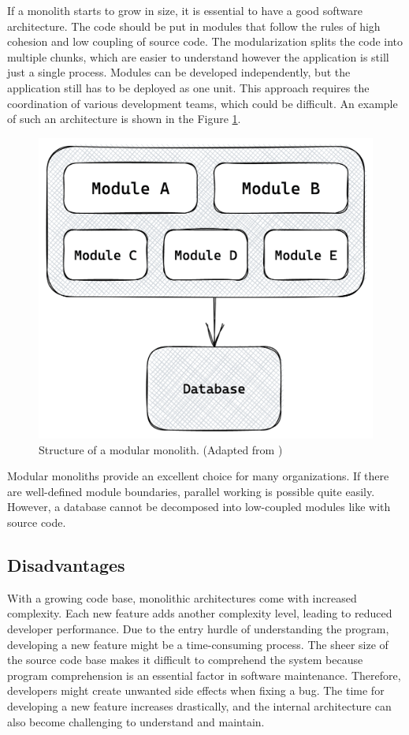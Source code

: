 \noindent If a monolith starts to grow in size, it is essential to have a good software architecture. The code should be put in modules that follow the rules of high cohesion and low coupling of source code. The modularization splits the code into multiple chunks, which are easier to understand however the application is still just a single process. Modules can be developed independently, but the application still has to be deployed as one unit. This approach requires the coordination of various development teams, which could be difficult. \cite[12-13]{book:2018:richardson:background:bff:microservices-patterns} \cite[12-13]{book:2019:newman:background:monolith:monolith-to-microservices} An example of such an architecture is shown in the Figure \ref{fig:background:monolith:module-monolith-sketch}.

\ifshowImages
\begin{figure}[H]
  \centering
  \includegraphics[width=0.4\linewidth]{images/background/monolith/modular-monolith-sketch.png}
  \caption{Structure of a modular monolith. (Adapted from \cite[13]{book:2019:newman:background:monolith:monolith-to-microservices})}\label{fig:background:monolith:module-monolith-sketch}
\end{figure}
\fi

\noindent Modular monoliths provide an excellent choice for many organizations. If there are well-defined module boundaries, parallel working is possible quite easily. However, a database cannot be decomposed into low-coupled modules like with source code. \cite[12-13]{book:2019:newman:background:monolith:monolith-to-microservices}

\subsection{Disadvantages}\label{subsection:background:software-monolith:disadvantages}

With a growing code base, monolithic architectures come with increased complexity. Each new feature adds another complexity level, leading to reduced developer performance. Due to the entry hurdle of understanding the program, developing a new feature might be a time-consuming process. The sheer size of the source code base makes it difficult to comprehend the system because program comprehension is an essential factor in software maintenance. \cite{article:1995:mayrhauser:background:monoliths:program-comprehension-during-software-maintenance-and-evolution} Therefore, developers might create unwanted side effects when fixing a bug. The time for developing a new feature increases drastically, and the internal architecture can also become challenging to understand and maintain. \cite[4-6]{book:2018:richardson:background:bff:microservices-patterns}

